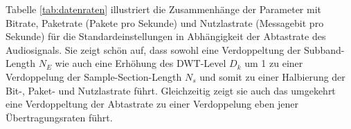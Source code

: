 Tabelle \ref{tab:datenraten} illustriert die Zusammenhänge der Parameter mit Bitrate, Paketrate (Pakete pro Sekunde) und Nutzlastrate (Messagebit pro Sekunde) für die Standardeinstellungen in Abhängigkeit der Abtastrate des Audiosignals. Sie zeigt schön auf, dass sowohl eine Verdoppeltung der Subband-Length $N_E$ wie auch eine Erhöhung des DWT-Level $D_k$ um 1 zu einer Verdoppelung der Sample-Section-Length $N_s$ und somit zu einer Halbierung der Bit-, Paket- und Nutzlastrate führt. Gleichzeitig zeigt sie auch das umgekehrt eine Verdoppeltung der Abtastrate zu einer Verdoppelung eben jener Übertragungsraten führt. 


